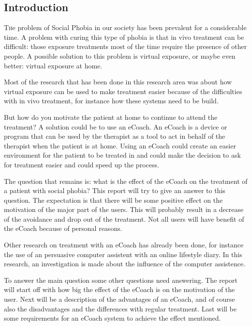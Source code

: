 \documentclass[twoside]{article}
\begin{document}
\begin{multicols}{2} %

\section{Introduction}

\lettrine[nindent=0em,lines=3]{T}he problem of Social Phobia in our society has been prevalent for a considerable time. A problem with curing this type of phobia is that in vivo treatment can be difficult: those exposure treatments most of the time require the presence of other people. A possible solution to this problem is virtual exposure, or maybe even better: virtual exposure at home.

Most of the research that has been done in this research area was about how virtual exposure can be used to make treatment easier because of the difficulties with in vivo treatment, for instance how these systems need to be build\cite{brinkman2012virtual}.

But how do you motivate the patient at home to continue to attend the treatment? A solution could be to use an eCoach. An eCoach is a device or program that can be used by the therapist as a tool to act in behalf of the therapist when the patient is at home. Using an eCoach could create an easier environment for the patient to be treated in and could make the decision to ask for treatment easier and could speed up the process.

The question that remains is: what is the effect of the eCoach on the treatment of a patient with social phobia? This report will try to give an answer to this question. The expectation is that there will be some positive effect on the motivation of the major part of the users. This will probably result in a decrease of the avoidance and drop out of the treatment. Not all users will have benefit of the eCoach because of personal reasons. 

Other research on treatment with an eCoach has already been done, for instance the use of an persuasive computer assistent with an online lifestyle diary\cite{blanson2009online}. In this research, an investigation is made about the influence of the computer assistence. 

To answer the main question some other questions need answering. The report will start off with how big the effect of the eCoach is on the motivation of the user. Next will be a description of the advantages of an eCoach, and of course also the disadvantages and the differences with regular treatment. Last will be some requirements for an eCoach system to achieve the effect mentioned.


\end{multicols}
\end{document}
